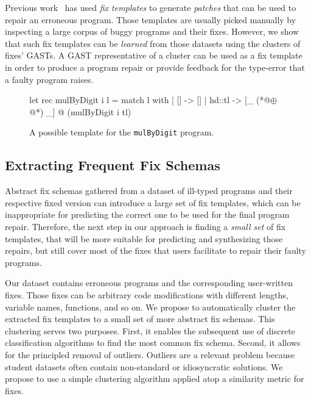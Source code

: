 Previous work~\citep[][]{martinez2013automatically,
martinez2015mining} has used \emph{fix templates} to generate \emph{patches}
that can be used to repair an erroneous program. Those templates are usually
picked manually by inspecting a large corpus of buggy programs and their fixes.
However, we show that such fix templates can be \emph{learned} from those
datasets using the clusters of fixes' GASTs. A GAST representative of a cluster
can be used as a fix template in order to produce a program repair or provide
feedback for the type-error that a faulty program raises.


\begin{figure}[ht]
\begin{ecode}
let rec mulByDigit i l =
  match l with
  | []     -> []
  | hd::tl -> [_ (*@$\oplus$@*) _] @ (mulByDigit i tl)
\end{ecode}
\caption{A possible template for the \texttt{mulByDigit} program.}
\label{fig:suggestion}
\end{figure}



\subsection{Extracting Frequent Fix Schemas}
\label{subsec:step3}

Abstract fix schemas gathered from a dataset of ill-typed programs and their
respective fixed version can introduce a large set of fix templates, which can
be inappropriate for predicting the correct one to be used for the final program
repair. Therefore, the next step in our approach is finding a \emph{small set}
of fix templates, that will be more suitable for predicting and synthesizing
those repairs, but still cover most of the fixes that users facilitate to repair
their faulty programs.

 Our dataset contains erroneous programs and the
corresponding user-written fixes. Those fixes can be arbitrary code
modifications with different lengths, variable names, functions, and so on. We
propose to automatically cluster the extracted fix templates to a small set of
more abstract fix schemas. This clustering serves two purposes. First, it
enables the subsequent use of discrete classification algorithms to find the
most common fix schema. Second, it allows for the principled removal of
outliers. Outliers are a relevant problem because student datasets often contain
non-standard or idiosyncratic solutions. We propose to use a simple clustering
algorithm applied atop a similarity metric for fixes.



